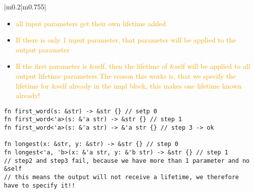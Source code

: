 \documentclass[main.tex,fontsize=8pt,paper=a4,paper=portrait,DIV=calc,]{scrartcl}
\begin{document}
\begin{table}[ht!]
\begin{tabular}{|m{0.2\linewidth}|m{0.755\linewidth}|}
\begin{itemize}
\item \textcolor{orange}{all input parameters get their own lifetime added}
\item \textcolor{orange}{If there is only 1 input parameter, that parameter will be applied to the output parameter}
\item \textcolor{orange}{If the first parameter is \&self, then the lifetime of \&self will be applied to all output lifetime parameters\newline
  The reason this works is, that we specify the lifetime for \&self already in the impl block, this makes one lifetime known already!}
\end{itemize}
\begin{lstlisting}
fn first_word(s: &str) -> &str {} // setp 0
fn first_word<'a>(s: &'a str) -> &str {} // step 1
fn first_word<'a>(s: &'a str) -> &'a str {} // step 3 -> ok

fn longest(x: &str, y: &str) -> &str {} // step 0
fn longest<'a, 'b>(x: &'a str, y: &'b str) -> &str {} // step 1
// step2 and step3 fail, because we have more than 1 parameter and no &self
// this means the output will not receive a lifetime, we therefore have to specify it!!
\end{lstlisting}\\
\hline
\end{tabular}
\end{table}
\pagebreak
\end{document}
